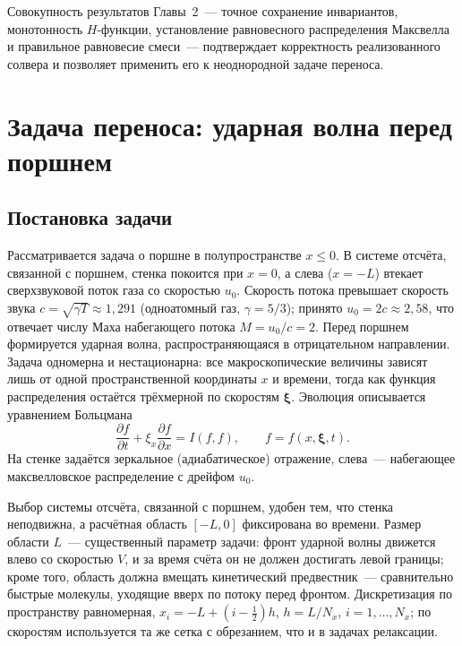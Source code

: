\documentclass[14pt,a4paper]{extreport}
\numberwithin{equation}{chapter}
\numberwithin{figure}{chapter}
\numberwithin{table}{chapter}
\newcommand{\xv}{\boldsymbol{\xi}}
\begin{document}
Совокупность результатов Главы~2~--- точное сохранение инвариантов, монотонность $H$-функции, установление равновесного
распределения Максвелла и правильное равновесие смеси~--- подтверждает корректность реализованного солвера и позволяет
применить его к неоднородной задаче переноса.




\chapter{Задача переноса: ударная волна перед поршнем}

\section{Постановка задачи}

Рассматривается задача о поршне в полупространстве $x\le 0$.
В системе отсчёта, связанной с поршнем, стенка покоится при $x=0$, а слева ($x=-L$) втекает сверхзвуковой поток газа со
скоростью $u_0$.
Скорость потока превышает скорость звука $c=\sqrt{\gamma T}\approx 1{,}291$ (одноатомный газ, $\gamma=5/3$); принято
$u_0=2c\approx 2{,}58$, что отвечает числу Маха набегающего потока $M=u_0/c=2$.
Перед поршнем формируется ударная волна, распространяющаяся в отрицательном направлении.
Задача одномерна и нестационарна: все макроскопические величины зависят лишь от одной пространственной координаты $x$ и
времени, тогда как функция распределения остаётся трёхмерной по скоростям $\xv$.
Эволюция описывается уравнением Больцмана
\begin{equation}
    \frac{\partial f}{\partial t}+\xi_x\frac{\partial f}{\partial x}=I(f,f),\qquad f=f(x,\xv,t).
\end{equation}
На стенке задаётся зеркальное (адиабатическое) отражение, слева~--- набегающее максвелловское распределение с дрейфом
$u_0$.

Выбор системы отсчёта, связанной с поршнем, удобен тем, что стенка неподвижна, а расчётная область $[-L,0]$ фиксирована
во времени.
Размер области $L$~--- существенный параметр задачи: фронт ударной волны движется влево со скоростью $V$, и за время
счёта он не должен достигать левой границы; кроме того, область должна вмещать кинетический предвестник~--- сравнительно
быстрые молекулы, уходящие вверх по потоку перед фронтом.
Дискретизация по пространству равномерная, $x_i=-L+(i-\tfrac12)h$, $h=L/N_x$, $i=1,\dots,N_x$; по скоростям используется
та же сетка с обрезанием, что и в задачах релаксации.
\end{document}
